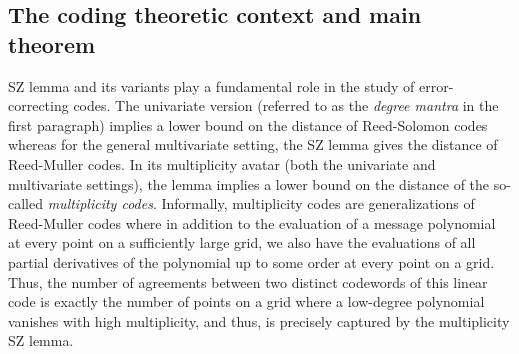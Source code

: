 \documentclass{theoretics}
\begin{document}
	\subsection{The coding theoretic context and main theorem}
	SZ lemma and its variants play a fundamental role in the study of error-correcting codes. The univariate version (referred to as the \emph{degree mantra} in the first paragraph) implies a lower bound on the distance of Reed-Solomon codes whereas for the general multivariate setting, the SZ lemma gives the distance of Reed-Muller codes. In its multiplicity avatar (both the univariate and multivariate settings), the lemma implies a lower bound on the distance of the so-called \emph{multiplicity codes}. Informally, multiplicity codes are generalizations of Reed-Muller codes where in addition to the evaluation of a message polynomial at every point on a sufficiently large grid, we also have the evaluations of all partial derivatives of the polynomial up to some order at every point on a grid. Thus, the number of agreements between two distinct codewords of this linear code is exactly  the number of points on a grid where a low-degree polynomial vanishes with high multiplicity, and thus, is precisely captured by the multiplicity SZ lemma. 
	
\end{document}
